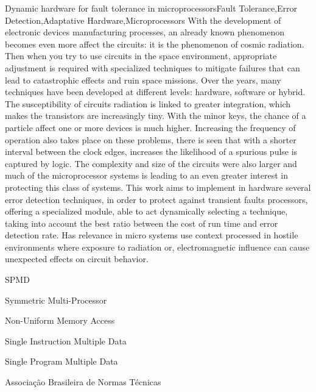 \documentclass[pgmicro,diss,openright,oneside]{iiufrgs}
\begin{document}
\begin{englishabstract}{Dynamic hardware for fault tolerance in microprocessors}{Fault Tolerance,Error Detection,Adaptative Hardware,Microprocessors}
With the development of electronic devices manufacturing processes, an already known phenomenon becomes even more affect the circuits: it is the phenomenon of cosmic radiation. Then when you try to use circuits in the space environment, appropriate adjustment is required with specialized techniques to mitigate failures that can lead to catastrophic effects and ruin space missions. Over the years, many techniques have been developed at different levels: hardware, software or hybrid. The susceptibility of circuits radiation is linked to greater integration, which makes the transistors are increasingly tiny. With the minor keys, the chance of a particle affect one or more devices is much higher. Increasing the frequency of operation also takes place on these problems, there is seen that with a shorter interval between the clock edges, increases the likelihood of a spurious pulse is captured by logic. The complexity and size of the circuits were also larger and much of the microprocessor systems is leading to an even greater interest in protecting this class of systems. This work aims to implement in hardware several error detection techniques, in order to protect against transient faults processors, offering a specialized module, able to act dynamically selecting a technique, taking into account the best ratio between the cost of run time and error detection rate. Has relevance in micro systems use context processed in hostile environments where exposure to radiation or, electromagnetic influence can cause unexpected effects on circuit behavior.
\end{englishabstract}

\begin{listofabbrv}{SPMD}
        \item[SMP] Symmetric Multi-Processor
        \item[NUMA] Non-Uniform Memory Access
        \item[SIMD] Single Instruction Multiple Data
        \item[SPMD] Single Program Multiple Data
        \item[ABNT] Associação Brasileira de Normas Técnicas
\end{listofabbrv}
\end{document}
